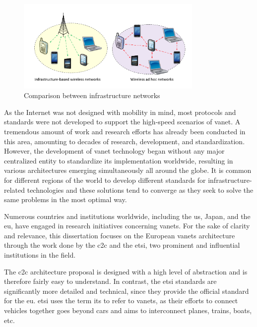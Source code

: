 \begin{figure}[htbp]
	\centering
	\includegraphics[width=0.8\textwidth]{Chapters/Figures/VANETs/ad_hoc_networks.png}
	\caption{Comparison between infrastructure networks~\cite{dinh_thai_applications_2015}}
	\label{fig:ad_hoc}
\end{figure}


As the Internet was not designed with mobility in mind, most protocols and standards were not developed to support the high-speed scenarios of \gls{vanet}. A tremendous amount of work and research efforts has already been conducted in this area, amounting to decades of research, development, and standardization. However, the development of \gls{vanet} technology began without any major centralized entity to standardize its implementation worldwide, resulting in various architectures emerging simultaneously all around the globe. It is common for different regions of the world to develop different standards for infrastructure-related technologies and these solutions tend to converge as they seek to solve the same problems in the most optimal way. 

Numerous countries and institutions worldwide, including the \gls{us}, Japan, and the \gls{eu}, have engaged in research initiatives concerning \glspl{vanet}. For the sake of clarity and relevance, this dissertation focuses on the European \glspl{vanet} architecture through the work done by the \gls{c2c} and the \gls{etsi}, two prominent and influential institutions in the field. 

The \gls{c2c} architecture proposal is designed with a high level of abstraction and is therefore fairly easy to understand. In contrast, the \gls{etsi} standards are significantly more detailed and technical, since they provide the official standard for the \gls{eu}. \gls{etsi} uses the term \gls{its} to refer to \glspl{vanet}, as their efforts to connect vehicles together goes beyond cars and aims to interconnect planes, trains, boats, etc.

